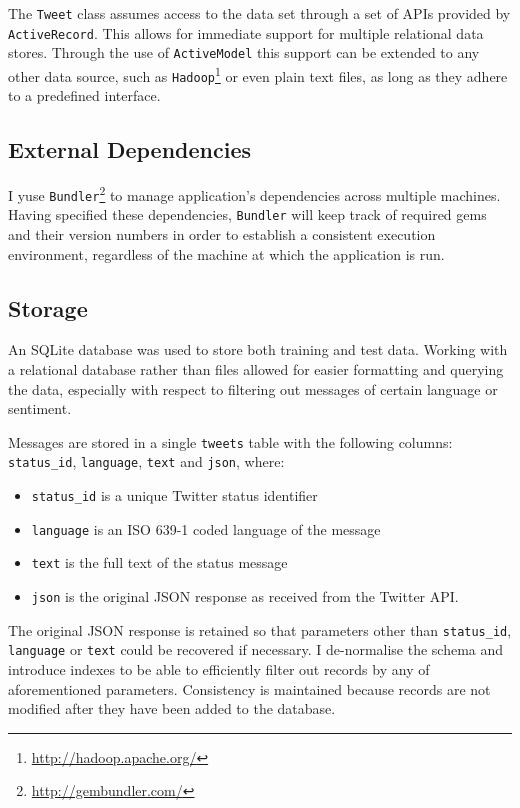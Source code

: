 The \verb|Tweet| class assumes access to the data set through a set of APIs provided by \verb|ActiveRecord|. This allows for immediate support for multiple relational data stores. Through the use of \verb|ActiveModel| this support can be extended to any other data source, such as \verb|Hadoop|\footnote{\url{http://hadoop.apache.org/}} or even plain text files, as long as they adhere to a predefined interface.

\subsection{External Dependencies}

I yuse \verb|Bundler|\footnote{\url{http://gembundler.com/}} to manage application's dependencies across multiple machines. Having specified these dependencies, \verb|Bundler| will keep track of required gems and their version numbers in order to establish a consistent execution environment, regardless of the machine at which the application is run.

\subsection{Storage}

An SQLite database was used to store both training and test data. Working with a relational database rather than files allowed for easier formatting and querying the data, especially with respect to filtering out messages of certain language or sentiment.

Messages are stored in a single \verb|tweets| table with the following columns: \verb|status_id|, \verb|language|, \verb|text| and \verb|json|, where:

\begin{itemize}
  \item \verb|status_id| is a unique Twitter status identifier
  \item \verb|language| is an ISO 639-1 coded language of the message
  \item \verb|text| is the full text of the status message
  \item \verb|json| is the original JSON response as received from the Twitter API.
\end{itemize}

The original JSON response is retained so that parameters other than \verb|status_id|, \verb|language| or \verb|text| could be recovered if necessary. I de-normalise the schema and introduce indexes to be able to efficiently filter out records by any of aforementioned parameters. Consistency is maintained because records are not modified after they have been added to the database.

